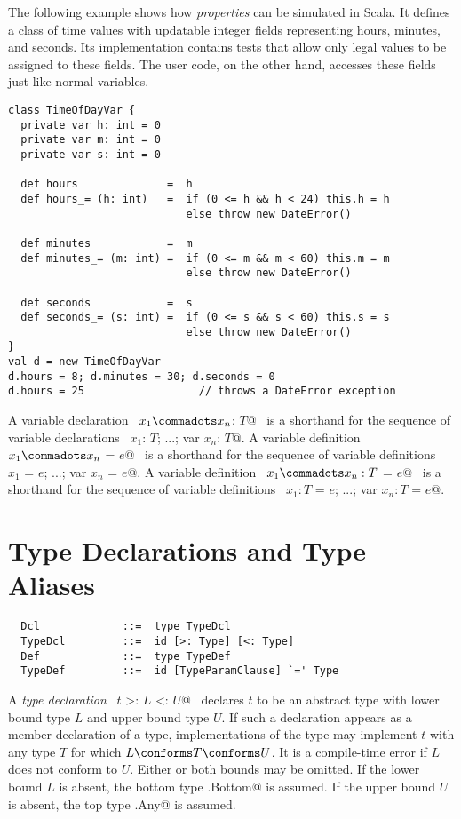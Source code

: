\example The following example shows how {\em properties} can be
simulated in Scala. It defines a class  of time
values with updatable integer fields representing hours, minutes, and
seconds. Its implementation contains tests that allow only legal
values to be assigned to these fields. The user code, on the other
hand, accesses these fields just like normal variables.

\begin{lstlisting}
class TimeOfDayVar {
  private var h: int = 0 
  private var m: int = 0 
  private var s: int = 0 

  def hours              =  h 
  def hours_= (h: int)   =  if (0 <= h && h < 24) this.h = h 
                            else throw new DateError() 

  def minutes            =  m 
  def minutes_= (m: int) =  if (0 <= m && m < 60) this.m = m
                            else throw new DateError() 

  def seconds            =  s 
  def seconds_= (s: int) =  if (0 <= s && s < 60) this.s = s
                            else throw new DateError() 
}
val d = new TimeOfDayVar 
d.hours = 8; d.minutes = 30; d.seconds = 0 
d.hours = 25                  // throws a DateError exception
\end{lstlisting}

A variable declaration ~\lstinline@var $x_1 \commadots x_n$: $T$@~
is a
shorthand for the sequence of variable declarations
~\lstinline@var $x_1$: $T$; ...; var $x_n$: $T$@.
A variable definition ~\lstinline@var $x_1 \commadots x_n$ = $e$@~
is a
shorthand for the sequence of variable definitions
~\lstinline@var $x_1$ = $e$; ...; var $x_n$ = $e$@.
A variable definition ~\lstinline@var $x_1 \commadots x_n: T$ = $e$@~
is a
shorthand for the sequence of variable definitions
~\lstinline@var $x_1: T$ = $e$; ...; var $x_n: T$ = $e$@.

\section{Type Declarations and Type Aliases}
\label{sec:typedcl}
\label{sec:typealias}

\syntax\begin{lstlisting}
  Dcl             ::=  type TypeDcl
  TypeDcl         ::=  id [>: Type] [<: Type]
  Def             ::=  type TypeDef
  TypeDef         ::=  id [TypeParamClause] `=' Type
\end{lstlisting}

A {\em type declaration} ~\lstinline@type $t$ >: $L$ <: $U$@~ declares
$t$ to be an abstract type with lower bound type $L$ and upper bound
type $U$.  If such a declaration appears as a member declaration of a
type, implementations of the type may implement $t$ with any type $T$
for which $L \conforms T \conforms U$. It is a compile-time error if
$L$ does not conform to $U$.  Either or both bounds may be omitted.
If the lower bound $L$ is absent, the bottom type
\lstinline@scala.Bottom@ is assumed.  If the upper bound $U$ is absent,
the top type \lstinline@scala.Any@ is assumed.

